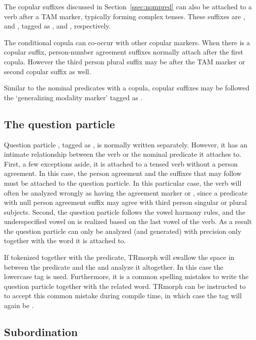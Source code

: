 \documentclass[twocolumn]{article}
\begin{document}
The copular suffixes discussed in Section~\ref{ssec:nompred} can also
be attached to a verb after a TAM marker, typically forming complex tenses. These
suffixes are ,  and , tagged as
,
 and
, respectively.

The conditional copula  can co-occur with other copular
markers. When there is a copular suffix, person-number agreement suffixes
normally attach after the first copula. However the third person
plural suffix may be after the TAM marker or second copular suffix as
well.

Similar to the nominal predicates with a copula, copular suffixes may
be followed the `generalizing modality marker'  tagged as
.

\subsection{\label{ssec:question}The question particle}

Question particle , tagged as , is normally
written separately. However, it has an intimate relationship between
the verb or the nominal predicate it attaches to. First, a few
exceptions aside, it is attached to a tensed verb without a person
agreement. In this case, the person agreement and the suffixes that
may follow must be attached to the question particle. In this
particular case, the verb will often be analyzed wrongly as having the
agreement marker  or , since a predicate with null
person agreement suffix may agree with third person singular or plural
subjects. Second, the question particle follows the vowel harmony
rules, and the underspecified vowel on  is realized based on
the last vowel of the verb.  As a result the question particle can
only be analyzed (and generated) with precision only together with the
word it is attached to.

If tokenized together with the predicate, TRmorph will swallow the
space in between the predicate and the  and analyze it
altogether. In this case the lowercase tag  is used.
Furthermore, it is a common spelling mistakes to write the question
particle together with the related word. TRmorph can be instructed to to
accept this common mistake during compile time, in which case the tag
will again be .

\subsection{\label{ssec:subordination}Subordination}
\end{document}
